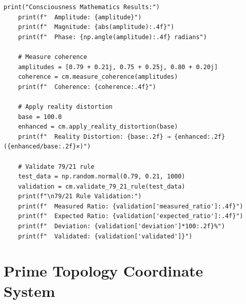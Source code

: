 \begin{lstlisting}[caption={79/21 Universal Coherence Rule Implementation},label={code:consciousness_math}]
    print("Consciousness Mathematics Results:")
    print(f"  Amplitude: {amplitude}")
    print(f"  Magnitude: {abs(amplitude):.4f}")
    print(f"  Phase: {np.angle(amplitude):.4f} radians")
    
    # Measure coherence
    amplitudes = [0.79 + 0.21j, 0.75 + 0.25j, 0.80 + 0.20j]
    coherence = cm.measure_coherence(amplitudes)
    print(f"  Coherence: {coherence:.4f}")
    
    # Apply reality distortion
    base = 100.0
    enhanced = cm.apply_reality_distortion(base)
    print(f"  Reality Distortion: {base:.2f} → {enhanced:.2f} ({enhanced/base:.2f}×)")
    
    # Validate 79/21 rule
    test_data = np.random.normal(0.79, 0.21, 1000)
    validation = cm.validate_79_21_rule(test_data)
    print(f"\n79/21 Rule Validation:")
    print(f"  Measured Ratio: {validation['measured_ratio']:.4f}")
    print(f"  Expected Ratio: {validation['expected_ratio']:.4f}")
    print(f"  Deviation: {validation['deviation']*100:.2f}%")
    print(f"  Validated: {validation['validated']}")
\end{lstlisting}

\section{Prime Topology Coordinate System}

